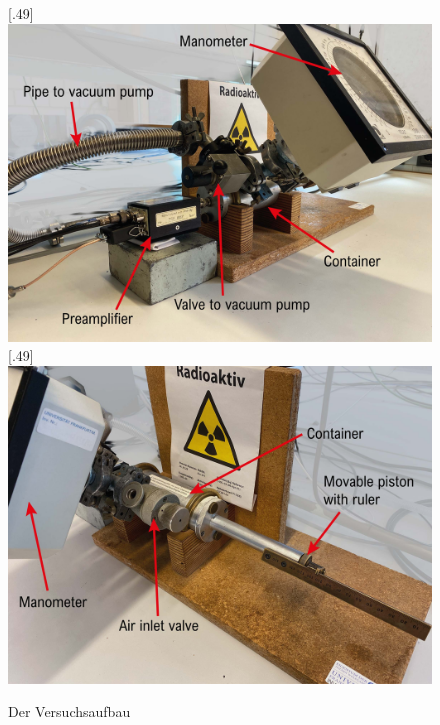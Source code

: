 \begin{figure}
	\centering
	[.49\linewidth]{\includegraphics[width=\linewidth]{img/setup_1.jpg}}
	[.49\linewidth]{\includegraphics[width=\linewidth]{img/setup_2.jpg}}
	\caption{Der Versuchsaufbau}
	\label{fig:setup_}
\end{figure}
